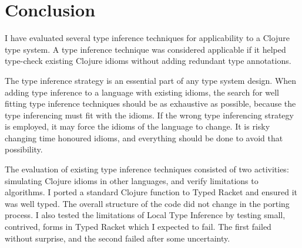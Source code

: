 \documentclass[12pt,a4paper]{article}
\begin{document}
%

\section{Conclusion}

I have evaluated several type inference techniques for applicability
to a Clojure type system. A type inference technique was considered
applicable if it helped type-check existing Clojure idioms without
adding redundant type annotations.

The type inference strategy is an essential part of any type system
design. When adding type inference to a language with
existing idioms, the search for well fitting type inference techniques
should be as exhaustive as possible, because the type inferencing must
fit with the idioms. If the wrong type inferencing strategy is employed,
it may force the idioms of the language to change. It is risky 
changing time honoured idioms, and everything should be done to avoid
that possibility.

The evaluation of existing type inference techniques consisted of two activities: simulating Clojure idioms
in other languages, and verify limitations to algorithms. I ported a
standard Clojure function to Typed Racket and ensured it was well typed.
The overall structure of the code did not change in the porting process.
I also tested the limitations of Local Type Inference by testing
small, contrived, forms in Typed Racket which I expected to fail. The first
failed without surprise, and the second failed after some uncertainty.
\end{document}
